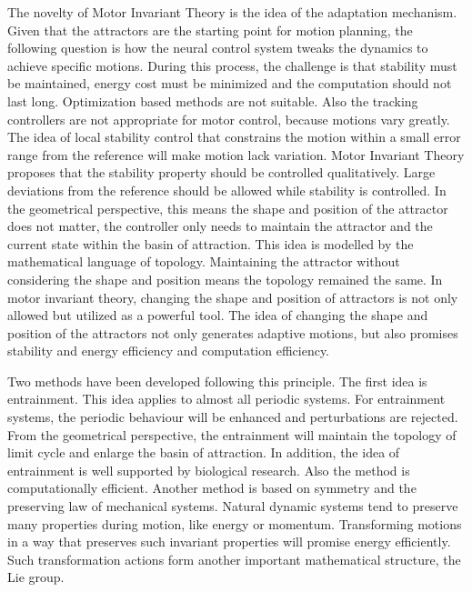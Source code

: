 The novelty of Motor Invariant Theory is the idea of the adaptation mechanism. 
Given that the attractors are the starting point for motion planning, the following question is how the neural control system tweaks the dynamics to achieve specific motions. 
During this process, the challenge is that stability must be maintained, energy cost must be minimized and the computation should not last long. 
Optimization based methods are not suitable.  
Also the tracking controllers are not appropriate for motor control, because motions vary greatly.
The idea of local stability control that constrains the motion within a small error range from the reference will make motion lack variation.  Motor Invariant Theory proposes that the stability property should be controlled qualitatively. 
Large deviations from the reference should be allowed while stability is controlled. 
In the geometrical perspective, this means the shape and position of the attractor does not matter, the controller only needs to maintain the attractor and the current state within the basin of attraction. 
This idea is modelled by the mathematical language of topology. 
Maintaining the attractor without considering the shape and position means  the topology remained the same. 
In motor invariant theory, changing the shape and position of attractors is not only allowed but utilized as a powerful tool.  
The idea of changing the shape and position of the attractors not only generates adaptive motions, but also promises stability and energy efficiency and computation efficiency. 

Two methods have been developed following this principle. 
The first idea is entrainment. 
This idea applies to almost all periodic systems. 
For entrainment systems, the periodic behaviour will be enhanced and perturbations are rejected. 
From the geometrical perspective, the entrainment will maintain the topology of limit cycle and enlarge the basin of attraction. 
In addition, the idea of entrainment is well supported by biological research.  
Also the method is computationally efficient.
Another method is based on symmetry and the preserving law of mechanical systems. 
Natural dynamic systems tend to preserve many properties during motion, like energy or momentum. 
Transforming motions in a way that preserves such invariant properties will promise energy efficiently.
Such transformation actions form another important mathematical structure, the Lie group.


